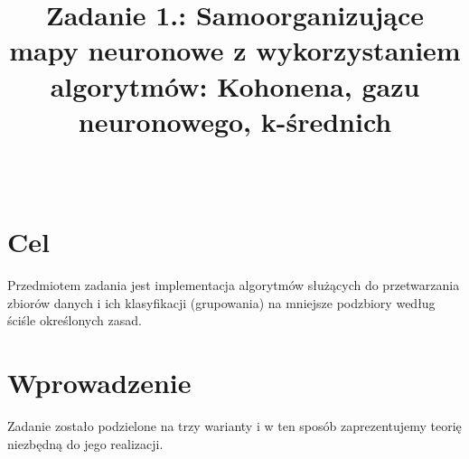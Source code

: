 \documentclass{classrep}
\author{%
  \studentinfo[203943@edu.p.lodz.pl]{Jakub Mielczarek}{203943}\\
  \studentinfo[203882@edu.p.lodz.pl]{Łukasz Gołębiewski}{203882}%
}
\title{Zadanie 1.: Samoorganizujące mapy neuronowe z wykorzystaniem algorytmów: Kohonena, gazu neuronowego, k-średnich}
\begin{document}
 
\maketitle 
\thispagestyle{fancyplain}

\section{Cel}
{\color{black}
Przedmiotem zadania jest implementacja algorytmów służących do przetwarzania zbiorów danych i ich klasyfikacji (grupowania) na mniejsze podzbiory według ściśle określonych zasad.

\section{Wprowadzenie}
{\color{black}
Zadanie zostało podzielone na trzy warianty i w ten sposób zaprezentujemy teorię niezbędną do jego realizacji.

}}
\end{document}
